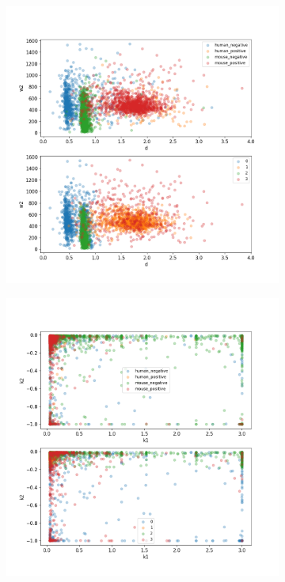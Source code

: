 \begin{figure}
\begin{subfigure}{0.3\textwidth}
	\end{subfigure}
	\hfill
	\begin{subfigure}{0.3\textwidth}
		\includegraphics[width=\textwidth]{fig/seperate_d_w2}
	\end{subfigure}
	\hfill
	\begin{subfigure}{0.3\textwidth}
		\includegraphics[width=\textwidth]{fig/seperate_k1_k2}

\end{subfigure}
\end{figure}

